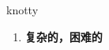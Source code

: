 
\begin{frame}
{\huge knotty}
\begin{center}
\begin{enumerate}\Large
  \item \textbf{复杂的，困难的}
\end{enumerate}
\end{center}
\end{frame}
